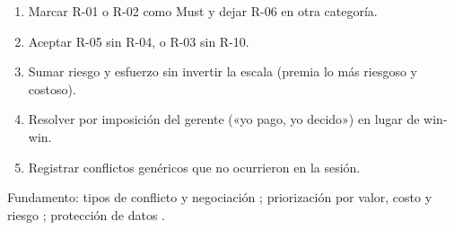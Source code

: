 \documentclass[11pt]{article}
\begin{document}
\begin{cajaclave}[title={Errores típicos a vigilar}]
	\begin{enumerate}[leftmargin=18pt,itemsep=1pt,topsep=2pt]
		\item Marcar R-01 o R-02 como Must y dejar R-06 en otra categoría.
		\item Aceptar R-05 sin R-04, o R-03 sin R-10.
		\item Sumar riesgo y esfuerzo sin invertir la escala (premia lo más riesgoso y costoso).
		\item Resolver por imposición del gerente («yo pago, yo decido») en lugar de win-win.
		\item Registrar conflictos genéricos que no ocurrieron en la sesión.
	\end{enumerate}
\end{cajaclave}

Fundamento: tipos de conflicto y negociación \citep{pohl_2025}; priorización por valor, costo y riesgo \citep{wiegers_beatty_2013}; protección de datos \citep{lopdp_2021}.



\end{document}
